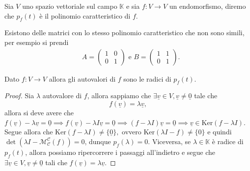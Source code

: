 \begin{definition}
    Sia $V$ uno spazio vettoriale sul campo $\mathbb{K}$ e sia $f: V \to V$ un endomorfismo, diremo che $p_f(t)$ è il polinomio caratteristico di $f$.
\end{definition}
\begin{example}
    Esistono delle matrici con lo stesso polinomio caratteristico che non sono simili, per esempio si prendi
    \begin{align}
        &A = \begin{pmatrix} 1 & 0 \\ 0 & 1 \end{pmatrix} \text{ e } B=\begin{pmatrix}
            1 & 1 \\
            0 & 1
        \end{pmatrix}.
    \end{align}
\end{example}
\begin{theorem}
    Dato $f: V \to V$ allora gli autovalori di $f$ sono le radici di $p_f(t)$.
\end{theorem}
\begin{proof}
    Sia $\lambda$ autovalore di $f$, allora sappiamo che $\exists \underline{v} \in V, \underline{v} \neq \underline{0}$ tale che
    $$
        f(\underline{v}) = \lambda \underline{v},
    $$
    allora si deve avere che $f(\underline{v}) - \lambda \underline{v} = \underline{0} \implies f(\underline{v}) - \lambda I \underline{v} = \underline{0} \implies (f - \lambda I)\underline{v} = \underline{0} \implies \underline{v} \in \text{Ker}(f-\lambda I)$. Segue allora che $\text{Ker}(f - \lambda I) \neq \{ \underline{0} \},$ ovvero $\text{Ker}(\lambda I - f) \neq \{ 0 \}$ e quindi $\det{(\lambda I - \mathcal{M}^\mathcal{C}_\mathcal{C}(f))} = 0$, dunque $p_f(\lambda) = 0$. Viceversa, se
    $\lambda \in \mathbb{K}$ è radice di $p_f(t)$, allora possiamo ripercorrere i passaggi all'indietro e segue che $\exists \underline{v} \in V, \underline{v} \neq \underline{0}$ tali che $f(\underline{v}) = \lambda \underline{v}$.
\end{proof}
